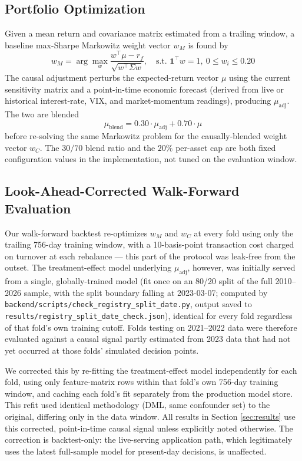 \documentclass[10pt,twocolumn]{article}
\begin{document}
\subsection{Portfolio Optimization}
Given a mean return and covariance matrix estimated from a trailing
window, a baseline max-Sharpe Markowitz weight vector $w_M$ is found by
\begin{equation}
w_M = \arg\max_w \frac{w^\top \mu - r_f}{\sqrt{w^\top \Sigma w}}, \quad
\text{s.t. } \mathbf{1}^\top w = 1,\ 0 \le w_i \le 0.20
\end{equation}
The causal adjustment perturbs the expected-return vector $\mu$ using
the current sensitivity matrix and a point-in-time economic forecast
(derived from live or historical interest-rate, VIX, and market-momentum
readings), producing $\mu_{\text{adj}}$. The two are blended
\begin{equation}
\mu_{\text{blend}} = 0.30 \cdot \mu_{\text{adj}} + 0.70 \cdot \mu
\end{equation}
before re-solving the same Markowitz problem for the causally-blended
weight vector $w_C$. The $30/70$ blend ratio and the $20\%$ per-asset cap
are both fixed configuration values in the implementation, not tuned on
the evaluation window.

\subsection{Look-Ahead-Corrected Walk-Forward Evaluation}
\label{sec:leakage-fix}
Our walk-forward backtest re-optimizes $w_M$ and $w_C$ at every fold
using only the trailing 756-day training window, with a 10-basis-point
transaction cost charged on turnover at each rebalance --- this part of
the protocol was leak-free from the outset. The treatment-effect model
underlying $\mu_{\text{adj}}$, however, was initially served from a
single, globally-trained model (fit once on an 80/20 split of the full
2010--2026 sample, with the split boundary falling at 2023-03-07;
computed by \texttt{backend/scripts/check\_registry\_split\_date.py},
output saved to \texttt{results/registry\_split\_date\_check.json}),
identical for every fold regardless of that fold's own training cutoff.
Folds testing on 2021--2022 data were therefore evaluated against a
causal signal partly estimated from 2023 data that had not yet occurred
at those folds' simulated decision points.

We corrected this by re-fitting the treatment-effect model independently
for each fold, using only feature-matrix rows within that fold's own
756-day training window, and caching each fold's fit separately from the
production model store. This refit used identical methodology
(DML, same confounder set) to the original, differing only in the data
window. All results in Section \ref{sec:results} use this corrected,
point-in-time causal signal unless explicitly noted otherwise. The
correction is backtest-only: the live-serving application path, which
legitimately uses the latest full-sample model for present-day decisions,
is unaffected.
\end{document}
